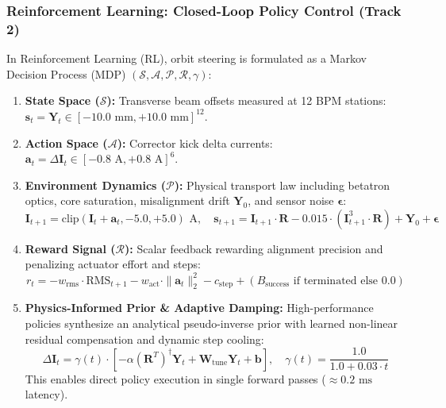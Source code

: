 \documentclass[11pt,a4paper]{article}
\begin{document}
\subsubsection{Reinforcement Learning: Closed-Loop Policy Control (Track 2)}
In Reinforcement Learning (RL), orbit steering is formulated as a Markov Decision Process (MDP) $(\mathcal{S}, \mathcal{A}, \mathcal{P}, \mathcal{R}, \gamma)$:
\begin{enumerate}
    \item \textbf{State Space ($\mathcal{S}$):} Transverse beam offsets measured at 12 BPM stations: $\mathbf{s}_t = \mathbf{Y}_t \in [-10.0\text{ mm}, +10.0\text{ mm}]^{12}$.
    \item \textbf{Action Space ($\mathcal{A}$):} Corrector kick delta currents: $\mathbf{a}_t = \Delta \mathbf{I}_t \in [-0.8\text{ A}, +0.8\text{ A}]^6$.
    \item \textbf{Environment Dynamics ($\mathcal{P}$):} Physical transport law including betatron optics, core saturation, misalignment drift $\mathbf{Y}_0$, and sensor noise $\boldsymbol{\epsilon}$:
    \begin{equation}
        \mathbf{I}_{t+1} = \text{clip}(\mathbf{I}_t + \mathbf{a}_t, -5.0, +5.0)\text{ A}, \quad \mathbf{s}_{t+1} = \mathbf{I}_{t+1} \cdot \mathbf{R} - 0.015 \cdot (\mathbf{I}_{t+1}^3 \cdot \mathbf{R}) + \mathbf{Y}_0 + \boldsymbol{\epsilon}
    \end{equation}
    \item \textbf{Reward Signal ($\mathcal{R}$):} Scalar feedback rewarding alignment precision and penalizing actuator effort and steps:
    \begin{equation}
        r_t = - w_{\text{rms}} \cdot \text{RMS}_{t+1} - w_{\text{act}} \cdot \|\mathbf{a}_t\|_2^2 - c_{\text{step}} + (B_{\text{success}} \text{ if terminated else } 0.0)
    \end{equation}
    \item \textbf{Physics-Informed Prior \& Adaptive Damping:} High-performance policies synthesize an analytical pseudo-inverse prior with learned non-linear residual compensation and dynamic step cooling:
    \begin{equation}
        \Delta \mathbf{I}_t = \gamma(t) \cdot \left[ - \alpha (\mathbf{R}^T)^\dagger \mathbf{Y}_t + \mathbf{W}_{\text{tune}} \mathbf{Y}_t + \mathbf{b} \right], \quad \gamma(t) = \frac{1.0}{1.0 + 0.03 \cdot t}
    \end{equation}
    This enables direct policy execution in single forward passes ($\approx 0.2\text{ ms}$ latency).
\end{enumerate}
\end{document}
